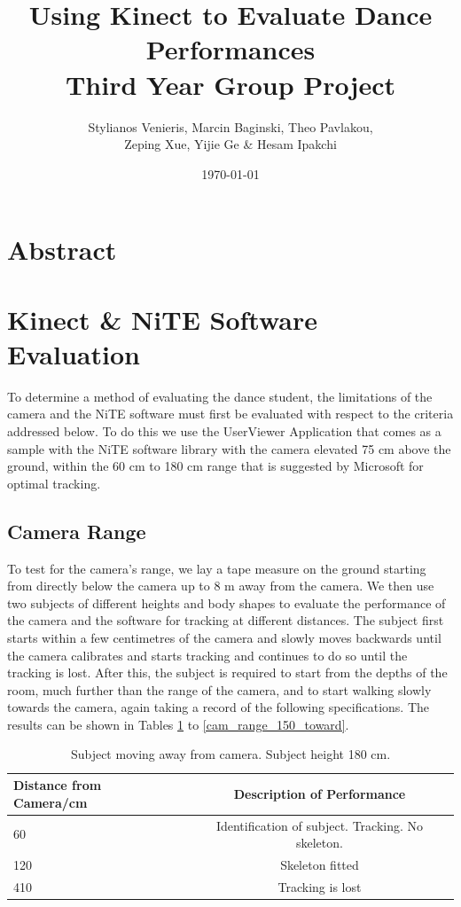 \documentclass[10pt]{article}
\begin{document}
\title{Using Kinect to Evaluate Dance Performances\\ Third Year Group Project}
\author{Stylianos Venieris, Marcin Baginski, Theo Pavlakou, \\Zeping Xue, Yijie Ge \& Hesam Ipakchi  }
\date{\today}
\maketitle
{}
\newpage

\setcounter{page}{1}
\section*{\center Abstract}

\section{Kinect \& NiTE Software Evaluation}
\noindent
To determine a method of evaluating the dance student, the limitations of the camera and the NiTE software must first be evaluated with respect to the criteria addressed below. To do this we use the UserViewer Application that comes as a sample with the NiTE software library with the camera elevated 75 cm above the ground, within the 60 cm to 180 cm range that is suggested by Microsoft for optimal tracking. 

\subsection{Camera Range}
\noindent 
To test for the camera's range, we lay a tape measure on the ground starting from directly below the camera up to 8 m away from the camera. We then use two subjects of different heights and body shapes to evaluate the performance of the camera and the software for tracking at different distances. The subject first starts within a few centimetres of the camera and slowly moves backwards until the camera calibrates and starts tracking and continues to do so until the tracking is lost. After this, the subject is required to start from the depths of the room, much further than the range of the camera, and to start walking slowly towards the camera, again taking a record of the following specifications. The results can be shown in Tables \ref{cam_range_180_away} to \ref{cam_range_150_toward}.
\\
\begin{table}[h]
\center
\begin{tabular}{ | l | c |}
\hline
Distance from Camera/cm & Description of Performance \\
\hline
60 & Identification of subject. Tracking. No skeleton.\\
120 & Skeleton fitted\\
410 & Tracking is lost\\
\hline
\end{tabular}
\caption{Subject moving away from camera. Subject height 180 cm.}
\label{cam_range_180_away}
\end{table}
\end{document}
